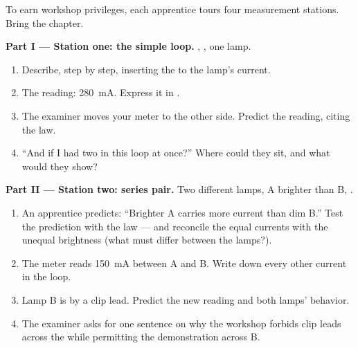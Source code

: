 \begin{problem}\label{pb:g8:intensity-ammeter:1}
To earn workshop privileges, each apprentice tours four
measurement stations. Bring the chapter.

\medskip\noindent\textbf{Part I --- Station one: the simple
loop.}
, , one lamp.
\begin{enumerate}
  \item Describe, step by step, inserting the  to
         the lamp's current.
  \item The reading: \qty{280}{mA}. Express it in .
  \item The examiner moves your meter to the  other
        side. Predict the reading, citing the law.
  \item ``And if I had two  in this loop at once?''
        Where could they sit, and what would they show?
\end{enumerate}

\medskip\noindent\textbf{Part II --- Station two: series
pair.}
Two different lamps, A brighter than B, .
\begin{enumerate}[resume]
  \item An apprentice predicts: ``Brighter A carries more
        current than dim B.'' Test the prediction with the law
        --- and reconcile the equal currents with the unequal
        brightness (what must differ between the lamps?).
  \item The meter reads \qty{150}{mA} between A and B. Write
        down every other current in the loop.
  \item Lamp B is  by a clip lead. Predict the
        new reading and both lamps' behavior.
  \item The examiner asks for one sentence on why the workshop
        forbids clip leads across the \emph{} while
        permitting the demonstration across B.
\end{enumerate}


\end{problem}
